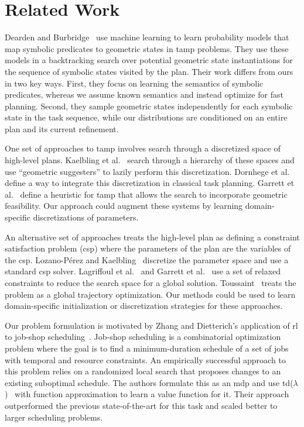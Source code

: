 \section{Related Work}
Dearden and Burbridge~\cite{deardenplanningtamp} use machine learning
to learn probability models that map symbolic predicates to
geometric states in {\sc tamp} problems. They use these models in a
backtracking search over potential geometric state instantiations for
the sequence of symbolic states visited by the plan.  Their work
differs from ours in two key ways. First, they focus on learning the
semantics of symbolic predicates, whereas we assume known semantics
and instead optimize for fast planning. Second, they sample geometric
states independently for each symbolic state in the task sequence,
while our distributions are conditioned on an entire plan and its
current refinement.

One set of approaches to {\sc tamp} involves search through a discretized space
of high-level plans. Kaelbling et al.~\cite{kaelbling2011hierarchical} search
through a hierarchy of these spaces and use ``geometric suggesters''
to lazily perform this discretization. Dornhege et
al.~\cite{dornhege2012semantic} define a way to integrate this
discretization in classical task planning. Garrett et
al.~\cite{GarrettWAFR14} define a heuristic for {\sc tamp} that allows
the search to incorporate geometric feasibility. Our approach could
augment these systems by learning domain-specific discretizations of
parameters.

An alternative set of approaches treats the high-level plan as defining a
constraint satisfaction problem ({\sc csp}) where the parameters of the plan
are the variables of the {\sc csp}. Lozano-P{\'e}rez and
Kaelbling~\cite{lozano2014constraint} discretize the parameter space
and use a standard {\sc csp} solver. Lagriffoul et
al.~\cite{lagriffoul2014orientation} and Garrett et
al.~\cite{garrett2015backward} use a set of relaxed constraints to
reduce the search space for a global
solution. Toussaint~\cite{toussaint2015logic} treats the problem as a
global trajectory optimization. Our methods could be used to learn
domain-specific initialization or discretization strategies for these
approaches.

Our problem formulation is motivated by Zhang and Dietterich's
application of {\sc rl} to job-shop
scheduling~\cite{JobShopSched}. Job-shop scheduling is a combinatorial
optimization problem where the goal is to find a minimum-duration
schedule of a set of jobs with temporal and resource constraints. An
empirically successful approach to this problem relies on a randomized
local search that proposes changes to an existing suboptimal
schedule. The authors formulate this as an {\sc mdp} and use {\sc
  td}($\lambda$)~\cite{suttonbarto} with function approximation to
learn a value function for it. Their approach outperformed the
previous state-of-the-art for this task and scaled better to larger scheduling
problems.

